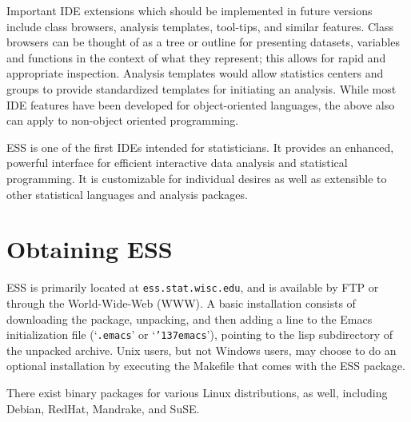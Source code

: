 \documentclass{article}
\newcommand{\stexttt}[1]{{\small\texttt{#1}}}
\newcommand{\US}{{\char'137}}        %
\newcommand{\file}[1]{`\stexttt{#1}'}
\begin{document}
Important IDE extensions which should be implemented in future
versions include class browsers, analysis templates, tool-tips, and
similar features.  Class browsers can be thought of as a tree or
outline for presenting datasets, variables and functions in the
context of what they represent; this allows for rapid and appropriate
inspection.  Analysis templates would allow statistics centers and
groups to provide standardized templates for initiating an analysis.
While most IDE features have been developed for object-oriented
languages, the above also can apply to non-object oriented
programming.

ESS is one of the first IDEs intended for statisticians.  It provides
an enhanced, powerful interface for efficient interactive data
analysis and statistical programming.  It is customizable for
individual desires as well as extensible to other statistical
languages and analysis packages.

\singlespace



\appendix
\section{Obtaining ESS}
\label{sec:getIt}

ESS \citep{ESS} is primarily located at \stexttt{ess.stat.wisc.edu}, and is
available by FTP or through the World-Wide-Web (WWW).  A basic
installation consists of downloading the package, unpacking, and then
adding a line to the Emacs initialization file (\file{.emacs} or
\file{\US emacs}), pointing to the lisp subdirectory of the unpacked
archive.  Unix users, but not Windows users, may choose to do an
optional installation by executing the Makefile that comes with the
ESS package.

There exist binary packages for various Linux distributions, as well,
including Debian, RedHat, Mandrake, and SuSE.
\end{document}

